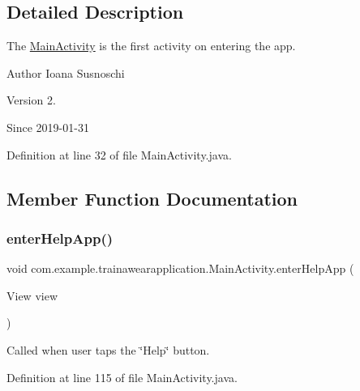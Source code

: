 \subsection{Detailed Description}
The \mbox{\hyperlink{classcom_1_1example_1_1trainawearapplication_1_1_main_activity}{Main\+Activity}} is the first activity on entering the app. 

\begin{DoxyAuthor}{Author}
Ioana Susnoschi 
\end{DoxyAuthor}
\begin{DoxyVersion}{Version}
2. 
\end{DoxyVersion}
\begin{DoxySince}{Since}
2019-\/01-\/31 
\end{DoxySince}


Definition at line 32 of file Main\+Activity.\+java.



\subsection{Member Function Documentation}
\mbox{\label{classcom_1_1example_1_1trainawearapplication_1_1_main_activity_a8f0652f7fc7f760d577d47b9ee3f9886}} 
\subsubsection{\texorpdfstring{enterHelpApp()}{enterHelpApp()}}
{\footnotesize\ttfamily void com.\+example.\+trainawearapplication.\+Main\+Activity.\+enter\+Help\+App (\begin{DoxyParamCaption}\item[{View}]{view }\end{DoxyParamCaption})\hspace{0.3cm}{\ttfamily [inline]}}



Called when user taps the \char`\"{}\+Help\char`\"{} button. 



Definition at line 115 of file Main\+Activity.\+java.


